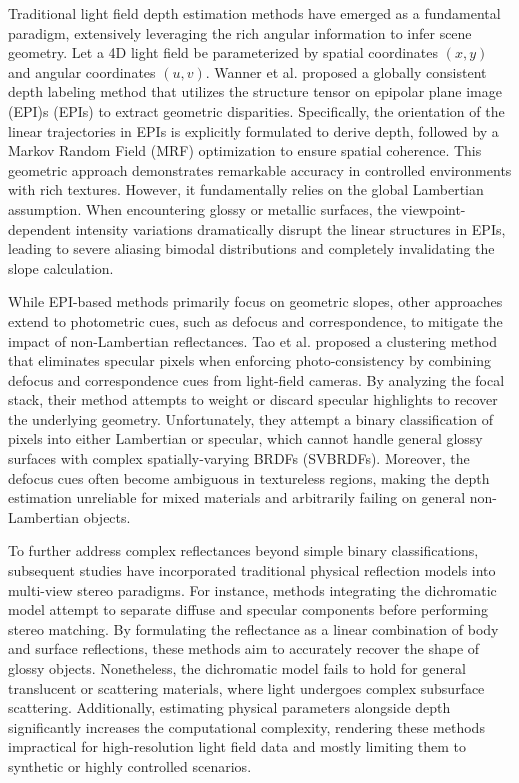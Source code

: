 \documentclass[lettersize,journal]{IEEEtran}
\begin{document}
Traditional light field depth estimation methods have emerged as a fundamental paradigm, extensively leveraging the rich angular information to infer scene geometry. Let a 4D light field be parameterized by spatial coordinates $(x, y)$ and angular coordinates $(u, v)$. Wanner et al.  proposed a globally consistent depth labeling method that utilizes the structure tensor on epipolar plane image (EPI)s (EPIs) to extract geometric disparities. Specifically, the orientation of the linear trajectories in EPIs is explicitly formulated to derive depth, followed by a Markov Random Field (MRF) optimization to ensure spatial coherence. This geometric approach demonstrates remarkable accuracy in controlled environments with rich textures. However, it fundamentally relies on the global Lambertian assumption. When encountering glossy or metallic surfaces, the viewpoint-dependent intensity variations dramatically disrupt the linear structures in EPIs, leading to severe aliasing bimodal distributions and completely invalidating the slope calculation.

While EPI-based methods primarily focus on geometric slopes, other approaches extend to photometric cues, such as defocus and correspondence, to mitigate the impact of non-Lambertian reflectances. Tao et al. \cite{taotao} proposed a clustering method that eliminates specular pixels when enforcing photo-consistency by combining defocus and correspondence cues from light-field cameras. By analyzing the focal stack, their method attempts to weight or discard specular highlights to recover the underlying geometry. Unfortunately, they attempt a binary classification of pixels into either Lambertian or specular, which cannot handle general glossy surfaces with complex spatially-varying BRDFs (SVBRDFs). Moreover, the defocus cues often become ambiguous in textureless regions, making the depth estimation unreliable for mixed materials and arbitrarily failing on general non-Lambertian objects.

To further address complex reflectances beyond simple binary classifications, subsequent studies have incorporated traditional physical reflection models into multi-view stereo paradigms. For instance, methods integrating the dichromatic model \cite{dichromati} attempt to separate diffuse and specular components before performing stereo matching. By formulating the reflectance as a linear combination of body and surface reflections, these methods aim to accurately recover the shape of glossy objects. Nonetheless, the dichromatic model fails to hold for general translucent or scattering materials, where light undergoes complex subsurface scattering. Additionally, estimating physical parameters alongside depth significantly increases the computational complexity, rendering these methods impractical for high-resolution light field data and mostly limiting them to synthetic or highly controlled scenarios.
\end{document}
